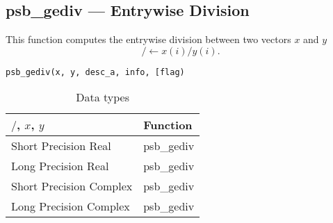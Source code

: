 \clearpage\subsection*{psb\_gediv --- Entrywise Division}

This function computes the entrywise division between two vectors $x$ and
$y$
\[/ \leftarrow x(i)/y(i).\]

\begin{verbatim}
psb_gediv(x, y, desc_a, info, [flag)
\end{verbatim}
\begin{table}[h]
	\begin{center}
		\begin{tabular}{ll}
			\hline
			$/$, $x$, $y$ & {\bf Function}\\
			\hline
			Short Precision Real & psb\_gediv \\
			Long Precision Real & psb\_gediv \\
			Short Precision Complex & psb\_gediv \\	
			Long Precision Complex & psb\_gediv \\	
			\hline
		\end{tabular}
	\end{center}
	\caption{Data types\label{tab:f90div}}
\end{table}

